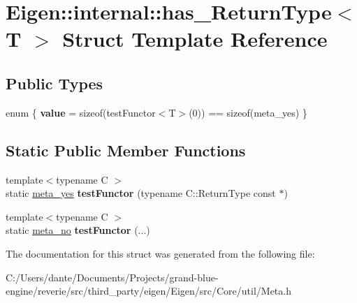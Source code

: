 \hypertarget{struct_eigen_1_1internal_1_1has___return_type}{}\section{Eigen\+::internal\+::has\+\_\+\+Return\+Type$<$ T $>$ Struct Template Reference}
\label{struct_eigen_1_1internal_1_1has___return_type}
\subsection*{Public Types}
\begin{DoxyCompactItemize}
\item 
\mbox{\label{struct_eigen_1_1internal_1_1has___return_type_a13dac68e81d790ed23d14c1028131627}} 
enum \{ {\bfseries value} = sizeof(test\+Functor$<$T$>$(0)) == sizeof(meta\+\_\+yes)
 \}
\end{DoxyCompactItemize}
\subsection*{Static Public Member Functions}
\begin{DoxyCompactItemize}
\item 
\mbox{\label{struct_eigen_1_1internal_1_1has___return_type_a2e051cf8e6689c9d4a93726ad162172a}} 
{\footnotesize template$<$typename C $>$ }\\static \mbox{\hyperlink{struct_eigen_1_1internal_1_1meta__yes}{meta\+\_\+yes}} {\bfseries test\+Functor} (typename C\+::\+Return\+Type const $\ast$)
\item 
\mbox{\label{struct_eigen_1_1internal_1_1has___return_type_a8383cc58906de2f78c9c03671a97e403}} 
{\footnotesize template$<$typename C $>$ }\\static \mbox{\hyperlink{struct_eigen_1_1internal_1_1meta__no}{meta\+\_\+no}} {\bfseries test\+Functor} (...)
\end{DoxyCompactItemize}


The documentation for this struct was generated from the following file\+:\begin{DoxyCompactItemize}
\item 
C\+:/\+Users/dante/\+Documents/\+Projects/grand-\/blue-\/engine/reverie/src/third\+\_\+party/eigen/\+Eigen/src/\+Core/util/Meta.\+h\end{DoxyCompactItemize}
